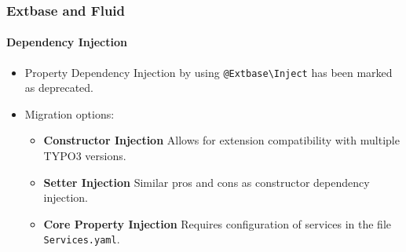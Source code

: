 %

\begin{frame}[fragile]
	\frametitle{Extbase and Fluid}
	\framesubtitle{Dependency Injection}


	\begin{itemize}
		\item Property Dependency Injection by using
			\small\texttt{@Extbase\textbackslash Inject}\normalsize\newline
			has been marked as deprecated.

		\item Migration options:

			\begin{itemize}\small
				\item \textbf{Constructor Injection}\newline
				 	Allows for extension compatibility with multiple TYPO3 versions.
				\item \textbf{Setter Injection}\newline
					Similar pros and cons as constructor dependency injection.
				\item \textbf{Core Property Injection}\newline
					Requires configuration of services in the file \texttt{Services.yaml}.
			\end{itemize}\normalsize

	\end{itemize}

\end{frame}

